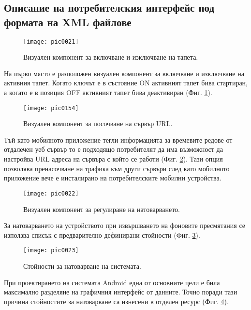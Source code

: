 \subsection{Описание на потребителския интерфейс под формата на XML файлове}

\begin{figure}[h]
  \centering
  \texttt{[image: pic0021]}
  \caption{Визуален компонент за включване и изключване на тапета.}
\label{fig:pic0021}
\end{figure}
\FloatBarrier

На първо място е разположен визуален компонент за включване и изключване на активния тапет. Когато ключът е в състояние ON активният тапет бива стартиран, а когато е в позиция OFF активният тапет бива деактивиран (Фиг. \ref{fig:pic0021}). 

\begin{figure}[h]
  \centering
  \texttt{[image: pic0154]}
  \caption{Визуален компонент за посочване на сървър URL.}
\label{fig:pic0154}
\end{figure}
\FloatBarrier

Тъй като мобилното приложение тегли информацията за времевите редове от отдалечен уеб сървър то е подходящо потребителят да има възможност да настройва URL адреса на сървъра с който се работи (Фиг. \ref{fig:pic0154}). Тази опция позволява пренасочване на трафика към други сървъри след като мобилното приложение вече е инсталирано на потребителските мобилни устройства.

\begin{figure}[h]
  \centering
  \texttt{[image: pic0022]}
  \caption{Визуален компонент за регулиране на натоварването.}
\label{fig:pic0022}
\end{figure}
\FloatBarrier

За натоварването на устройството при извършването на фоновите пресмятания се използва списък с предварително дефинирани стойности (Фиг. \ref{fig:pic0022}). 

\begin{figure}[h]
  \centering
  \texttt{[image: pic0023]}
  \caption{Стойности за натоварване на системата.}
\label{fig:pic0023}
\end{figure}
\FloatBarrier

При проектирането на системата Android една от основните цели е била максимално разделяне на графичния интерфейс от данните. Точно поради тази причина стойностите за натоварване са изнесени в отделен ресурс (Фиг. \ref{fig:pic0023}).

